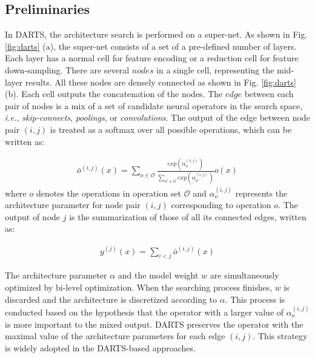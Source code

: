 \documentclass[journal]{IEEEtran}
\begin{document}
\subsection{Preliminaries}
In DARTS, the architecture search is performed on a super-net. As shown in Fig.  \ref{fig:darts} (a), the super-net consists of a set of a pre-defined number of layers. Each layer has a normal cell for feature encoding or a reduction cell for feature down-sampling. There are several $nodes$ in a single cell, representing the mid-layer results. All these nodes are densely connected as shown in Fig. \ref{fig:darts} (b). Each cell outputs the concatenation of the nodes. The $edge$ between each pair of nodes is a mix of a set of candidate neural operators in the search space, \emph {i.e.,} \textit{skip-connects}, \textit{poolings}, or \textit{convolutions}. The output of the edge between node pair $(i,j)$ is treated as a softmax over all possible operations, which can be written as:

\begin{equation}
\begin{aligned}
\bar{o}^{(i,j)}(x)=\sum_{o\in \mathcal{O}}\frac{exp(\alpha_o^{(i,j)})}{\sum_{o'\in \mathcal{O}} exp(\alpha_{o'}^{(i,j)})}o(x)
\label{Formula.1}
\end{aligned}
\end{equation}
where $o$ denotes the operations in operation set $\mathcal{O}$ and $\alpha_o^{(i,j)}$ represents the architecture parameter for node pair $(i,j)$ corresponding to operation $o$. The output of node $j$ is the summarization of those of all its connected edges, written as:

\begin{equation}
\begin{aligned}
y^{(j)}(x)=\sum_{i<j}\bar{o}^{(i,j)}(x)
\label{Formula.1.1}
\end{aligned}
\end{equation}

The architecture parameter $\alpha$ and the model weight $w$ are simultaneously optimized by bi-level optimization. When the searching process finishes, $w$ is discarded and the architecture is discretized according to $\alpha$. This process is conducted based on the hypothesis that the operator with a larger value of $\alpha_o^{(i,j)}$ is more important to the mixed output. DARTS preserves the operator with the maximal value of the architecture parameters for each edge $(i,j)$. This strategy is widely adopted in the DARTS-based approaches.
\end{document}
